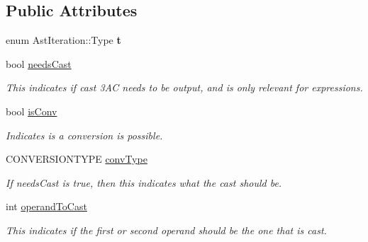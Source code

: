 \subsection*{Public Attributes}
\begin{DoxyCompactItemize}
\item 
\hypertarget{classAstIteration_adbd176496f2b513eed5dc55bc07ef94f}{enum Ast\-Iteration\-::\-Type {\bfseries t}}\label{classAstIteration_adbd176496f2b513eed5dc55bc07ef94f}

\item 
\hypertarget{classAST_aaf215802de409f8096c063d01ffa6783}{bool \hyperlink{classAST_aaf215802de409f8096c063d01ffa6783}{needs\-Cast}}\label{classAST_aaf215802de409f8096c063d01ffa6783}

\begin{DoxyCompactList}\small\item\em This indicates if cast 3\-A\-C needs to be output, and is only relevant for expressions. \end{DoxyCompactList}\item 
\hypertarget{classAST_afa9e77ef650ec6664458fa6cb55be985}{bool \hyperlink{classAST_afa9e77ef650ec6664458fa6cb55be985}{is\-Conv}}\label{classAST_afa9e77ef650ec6664458fa6cb55be985}

\begin{DoxyCompactList}\small\item\em Indicates is a conversion is possible. \end{DoxyCompactList}\item 
\hypertarget{classAST_a61ef3317e023d45237e06615b387cd6b}{C\-O\-N\-V\-E\-R\-S\-I\-O\-N\-T\-Y\-P\-E \hyperlink{classAST_a61ef3317e023d45237e06615b387cd6b}{conv\-Type}}\label{classAST_a61ef3317e023d45237e06615b387cd6b}

\begin{DoxyCompactList}\small\item\em If needs\-Cast is true, then this indicates what the cast should be. \end{DoxyCompactList}\item 
\hypertarget{classAST_aea9b07b39d24183f38c0029cec0a878e}{int \hyperlink{classAST_aea9b07b39d24183f38c0029cec0a878e}{operand\-To\-Cast}}\label{classAST_aea9b07b39d24183f38c0029cec0a878e}

\begin{DoxyCompactList}\small\item\em This indicates if the first or second operand should be the one that is cast. \end{DoxyCompactList}\end{DoxyCompactItemize}
